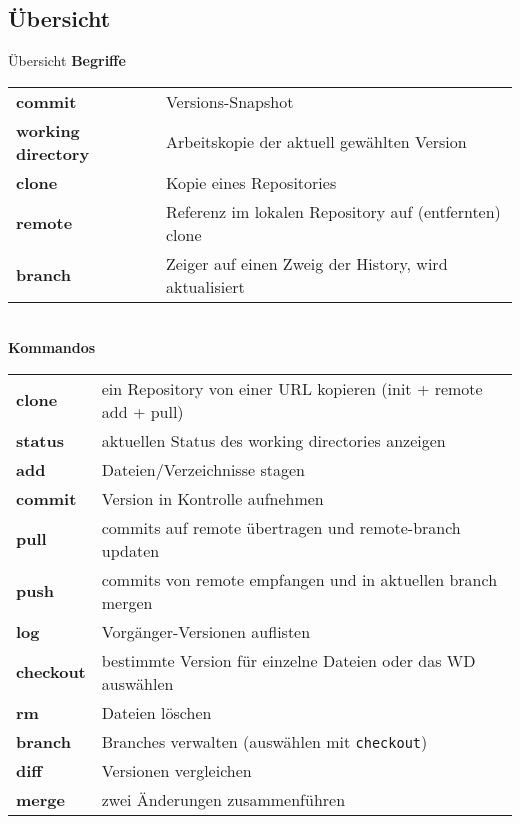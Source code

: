 \subsection{Übersicht}
\begin{frame}{Übersicht}
    \textbf{Begriffe}\\[0.5em]

    {\scriptsize
        \begin{tabular}{p{2.5cm}l}
            \textbf{commit}
                & Versions-Snapshot\\
            \textbf{working directory}
                & Arbeitskopie der aktuell gewählten Version\\
            \textbf{clone}
                & Kopie eines Repositories\\
            \textbf{remote}
                & Referenz im lokalen Repository auf (entfernten) clone\\
            \textbf{branch}
                & Zeiger auf einen Zweig der History, wird aktualisiert\\
        \end{tabular}
    }\\[1em]

    \textbf{Kommandos}\\[0.5em]

    {\scriptsize
        \begin{tabular}{p{2.5cm}l}
            \textbf{clone}
                & ein Repository von einer URL kopieren (init + remote add + pull)\\
            \textbf{status}
                & aktuellen Status des working directories anzeigen\\
            \textbf{add}
                & Dateien/Verzeichnisse stagen\\
            \textbf{commit}
                & Version in Kontrolle aufnehmen\\
            \textbf{pull}
                & commits auf remote übertragen und remote-branch updaten\\
            \textbf{push}
                & commits von remote empfangen und in aktuellen branch mergen\\
            \textbf{log}
                & Vorgänger-Versionen auflisten\\
            \textbf{checkout}
                & bestimmte Version für einzelne Dateien oder
                das WD auswählen\\
            \textbf{rm}
                & Dateien löschen\\
            \textbf{branch}
                & Branches verwalten (auswählen mit \texttt{checkout})\\
            \textbf{diff}
                & Versionen vergleichen\\
            \textbf{merge}
                & zwei Änderungen zusammenführen\\
        \end{tabular}
    }
\end{frame}
